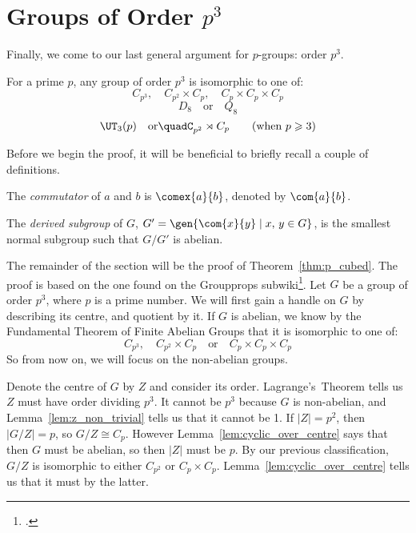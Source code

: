 \section{Groups of Order \(p^3\)}
Finally, we come to our last general argument for \(p\)-groups: order \(p^3\).

\begin{theorem}\label{thm:p_cubed}
    For a prime \(p\), any group of order \(p^3\) is isomorphic to one of:
    \[%
        C_{p^3}, \quad%
        C_{p^2} \times C_p, \quad%
        C_p \times C_p \times C_p
    \]
    \[
        D_8 \quad \text{or} \quad%
        Q_8 \tag{when \(p = 2\)}
    \]
    \[
        \UT_3(p) \quad \text{or} \quad%
        C_{p^2} \rtimes C_p \tag{when \(p \geqslant 3\)}
    \]
\end{theorem}

Before we begin the proof, it will be beneficial to briefly recall a couple of definitions.
\begin{definition}
    The \emph{commutator} of \(a\) and \(b\) is \(\comex{a}{b}\), denoted by \(\com{a}{b}\).

    The \emph{derived subgroup} of \(G\), \(G' = \gen{\com{x}{y} \mid x,\,y \in G}\), is the smallest normal
    subgroup such that \(G/G'\) is abelian.
\end{definition}

The remainder of the section will be the proof of Theorem~\ref{thm:p_cubed}.
The proof is based on the one found on the Groupprops subwiki\footcite{pcubed}.
Let \(G\) be a group of order \(p^3\), where \(p\) is a prime number.
We will first gain a handle on \(G\) by describing its centre, and quotient by it.
If \(G\) is abelian, we know by the Fundamental Theorem of Finite Abelian Groups that it is isomorphic to one of:
    \[C_{p^3}, \quad C_{p^2} \times C_p \quad \text{or} \quad C_p \times C_p \times C_p
    \tag{\star}\label{eqn:p_cubed_abelian}\]
So from now on, we will focus on the non-abelian groups.

Denote the centre of \(G\) by \(Z\) and consider its order.
Lagrange's~Theorem tells us \(Z\) must have order dividing \(p^3\).
It cannot be \(p^3\) because \(G\) is non-abelian, and Lemma~\ref{lem:z_non_trivial} tells us that it cannot be 1.
If \(|Z| = p^2\), then \(|G/Z| = p\), so \(G/Z \cong C_p\).
However Lemma~\ref{lem:cyclic_over_centre} says that then \(G\) must be abelian, so then \(|Z|\) must be \(p\).
By our previous classification, \(G/Z\) is isomorphic to either \(C_{p^2}\) or \(C_p \times C_p\).
Lemma~\ref{lem:cyclic_over_centre} tells us that it must by the latter.

